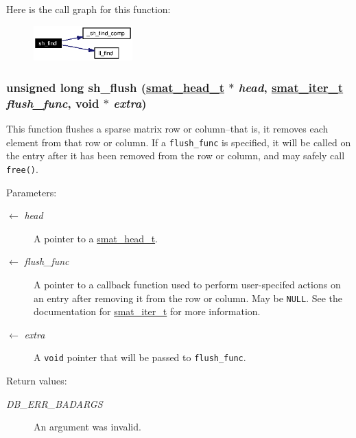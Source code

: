 Here is the call graph for this function:\begin{figure}[H]
\begin{center}
\leavevmode
\includegraphics[width=108pt]{group__dbprim__smat_ga20_cgraph}
\end{center}
\end{figure}
\hypertarget{group__dbprim__smat_ga22}{
\subsubsection[sh\_\-flush]{\setlength{\rightskip}{0pt plus 5cm}unsigned long sh\_\-flush (\hyperlink{struct__smat__head__s}{smat\_\-head\_\-t} $\ast$ {\em head}, \hyperlink{group__dbprim__smat_ga4}{smat\_\-iter\_\-t} {\em flush\_\-func}, void $\ast$ {\em extra})}}
\label{group__dbprim__smat_ga22}


This function flushes a sparse matrix row or column--that is, it removes each element from that row or column. If a {\tt flush\_\-func} is specified, it will be called on the entry after it has been removed from the row or column, and may safely call {\tt free()}.

\begin{Desc}
\item[Parameters:]
\begin{description}
\item[\mbox{$\leftarrow$} {\em head}]A pointer to a \hyperlink{group__dbprim__smat_ga1}{smat\_\-head\_\-t}. \item[\mbox{$\leftarrow$} {\em flush\_\-func}]A pointer to a callback function used to perform user-specifed actions on an entry after removing it from the row or column. May be {\tt NULL}. See the documentation for \hyperlink{group__dbprim__smat_ga4}{smat\_\-iter\_\-t} for more information. \item[\mbox{$\leftarrow$} {\em extra}]A {\tt void} pointer that will be passed to {\tt flush\_\-func}.\end{description}
\end{Desc}
\begin{Desc}
\item[Return values:]
\begin{description}
\item[{\em DB\_\-ERR\_\-BADARGS}]An argument was invalid.\end{description}
\end{Desc}


